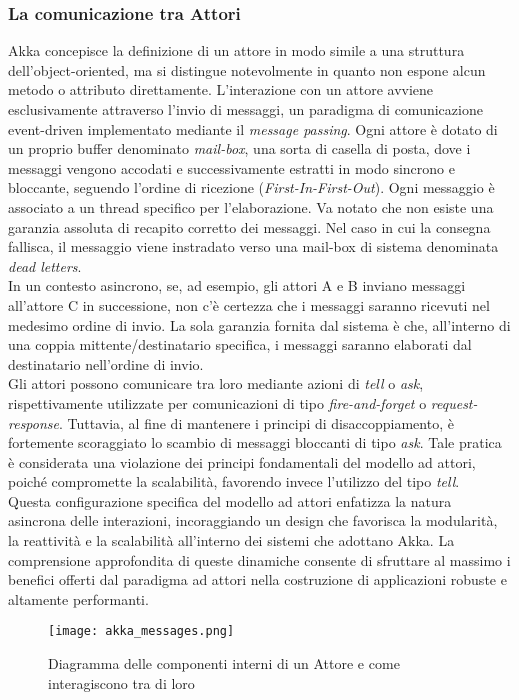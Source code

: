 \subsubsection[Comunicazione]{La comunicazione tra Attori}
Akka concepisce la definizione di un attore in modo simile a una struttura dell'object-oriented, ma si distingue notevolmente in quanto non espone alcun metodo o attributo direttamente.
L'interazione con un attore avviene esclusivamente attraverso l'invio di messaggi, un paradigma di comunicazione event-driven implementato mediante il \textit{message passing}.
Ogni attore è dotato di un proprio buffer denominato \textit{mail-box}, una sorta di casella di posta, dove i messaggi vengono accodati e successivamente estratti in modo sincrono e bloccante, seguendo l'ordine di ricezione (\textit{First-In-First-Out}).
Ogni messaggio è associato a un thread specifico per l'elaborazione.
Va notato che non esiste una garanzia assoluta di recapito corretto dei messaggi.
Nel caso in cui la consegna fallisca, il messaggio viene instradato verso una mail-box di sistema denominata \textit{dead letters}. \\
In un contesto asincrono, se, ad esempio, gli attori A e B inviano messaggi all'attore C in successione, non c'è certezza che i messaggi saranno ricevuti nel medesimo ordine di invio.
La sola garanzia fornita dal sistema è che, all'interno di una coppia mittente/destinatario specifica, i messaggi saranno elaborati dal destinatario nell'ordine di invio. \\
Gli attori possono comunicare tra loro mediante azioni di \textit{tell} o \textit{ask}, rispettivamente utilizzate per comunicazioni di tipo \textit{fire-and-forget} o \textit{request-response}.
Tuttavia, al fine di mantenere i principi di disaccoppiamento, è fortemente scoraggiato lo scambio di messaggi bloccanti di tipo \textit{ask}.
Tale pratica è considerata una violazione dei principi fondamentali del modello ad attori, poiché compromette la scalabilità, favorendo invece l'utilizzo del tipo \textit{tell}. \\
Questa configurazione specifica del modello ad attori enfatizza la natura asincrona delle interazioni, incoraggiando un design che favorisca la modularità, la reattività e la scalabilità all'interno dei sistemi che adottano Akka.
La comprensione approfondita di queste dinamiche consente di sfruttare al massimo i benefici offerti dal paradigma ad attori nella costruzione di applicazioni robuste e altamente performanti. 

\begin{figure}[H]
  \centering
  \texttt{[image: akka\_messages.png]}
  \caption[Componenti AKKA]{Diagramma delle componenti interni di un Attore e come interagiscono tra di loro}
\end{figure}

